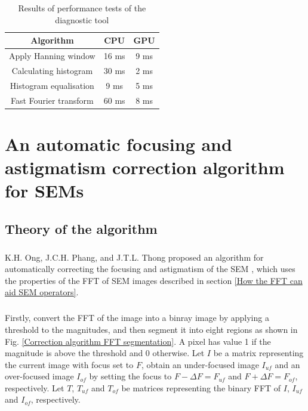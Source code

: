 \documentclass[12pt, twocolumn]{report}
\begin{document}
\begin{table}[htbp]
    \caption{Results of performance tests of the diagnostic tool}
    \begin{center}
    \begin{tabular}{|c|c|c|}
    \hline
    \textbf{Algorithm} & \textbf{CPU} & \textbf{GPU} \\
    \hline
    Apply Hanning window & 16 ms & 9 ms \\
    \hline
    Calculating histogram & 30 ms & 2 ms \\
    \hline
    Histogram equalisation & 9 ms & 5 ms \\
    \hline
    Fast Fourier transform & 60 ms & 8 ms \\
    \hline
    \end{tabular}
    \label{Software performance test}
    \end{center}
\end{table}

\chapter{An automatic focusing and astigmatism correction algorithm for SEMs} \label{An automatic focusing and astigmatism correction algorithm for SEMs}
\section{Theory of the algorithm}
\paragraph{}
K.H. Ong, J.C.H. Phang, and J.T.L. Thong proposed an algorithm for automatically correcting the focusing and astigmatism of the SEM \cite{SEM correction algorithm}, which uses the properties of the FFT of SEM images described in section \ref{How the FFT can aid SEM operators}.

\paragraph{}
Firstly, convert the FFT of the image into a binray image by applying a threshold to the magnitudes, and then segment it into eight regions as shown in Fig. \ref{Correction algorithm FFT segmentation}. A pixel has value 1 if the magnitude is above the threshold and 0 otherwise. Let $I$ be a matrix representing the current image with focus set to $F$, obtain an under-focused image $I_{uf}$ and an over-focused image $I_{of}$ by setting the focus to $F-\Delta F=F_{uf}$ and $F+\Delta F=F_{of}$, respectively. Let $T$, $T_{uf}$ and $T_{of}$ be matrices representing the binary FFT of $I$, $I_{uf}$ and $I_{of}$, respectively.
\end{document}
